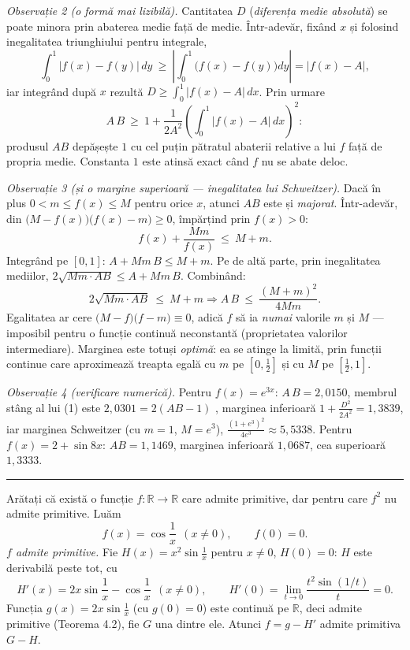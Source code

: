 \emph{Observație 2 (o formă mai lizibilă).} Cantitatea $D$ (\emph{diferența medie absolută}) se poate minora prin abaterea medie față de medie. Într-adevăr, fixând $x$ și folosind inegalitatea triunghiului pentru integrale,
\[ \int_{0}^{1}\bigl|f(x)-f(y)\bigr|\,dy\ \ge\ \left|\int_{0}^{1}\bigl(f(x)-f(y)\bigr)dy\right|=\bigl|f(x)-A\bigr| , \]
iar integrând după $x$ rezultă $D\ge\displaystyle\int_{0}^{1}\bigl|f(x)-A\bigr|\,dx$. Prin urmare
\[ A\,B\ \ge\ 1+\frac{1}{2A^{2}}\left(\int_{0}^{1}\bigl|f(x)-A\bigr|\,dx\right)^{2} : \]
produsul $AB$ depășește $1$ cu cel puțin pătratul abaterii relative a lui $f$ față de propria medie. Constanta $1$ este atinsă exact când $f$ nu se abate deloc.

\emph{Observație 3 (și o margine superioară --- inegalitatea lui Schweitzer).} Dacă în plus $0<m\le f(x)\le M$ pentru orice $x$, atunci $AB$ este și \emph{majorat}. Într-adevăr, din $\bigl(M-f(x)\bigr)\bigl(f(x)-m\bigr)\ge0$, împărțind prin $f(x)>0$:
\[ f(x)+\frac{Mm}{f(x)}\ \le\ M+m . \]
Integrând pe $[0,1]$: $A+Mm\,B\le M+m$. Pe de altă parte, prin inegalitatea mediilor, $2\sqrt{Mm\cdot AB}\le A+Mm\,B$. Combinând:
\[ 2\sqrt{Mm\cdot AB}\ \le\ M+m \Longrightarrow A\,B\ \le\ \frac{(M+m)^{2}}{4Mm} . \]
Egalitatea ar cere $\bigl(M-f\bigr)\bigl(f-m\bigr)\equiv0$, adică $f$ să ia \emph{numai} valorile $m$ și $M$ --- imposibil pentru o funcție continuă neconstantă (proprietatea valorilor intermediare). Marginea este totuși \emph{optimă}: ea se atinge la limită, prin funcții continue care aproximează treapta egală cu $m$ pe $\left[0,\frac12\right]$ și cu $M$ pe $\left[\frac12,1\right]$.

\emph{Observație 4 (verificare numerică).} Pentru $f(x)=e^{3x}$: $A\,B=2{,}0150$, membrul stâng al lui (1) este $2{,}0301=2(AB-1)$ \checkmark, marginea inferioară $1+\frac{D^{2}}{2A^{2}}=1{,}3839$, iar marginea Schweitzer (cu $m=1$, $M=e^{3}$), $\frac{(1+e^{3})^{2}}{4e^{3}}\approx5{,}5338$. Pentru $f(x)=2+\sin 8x$: $AB=1{,}1469$, marginea inferioară $1{,}0687$, cea superioară $1{,}3333$.
\vspace{1mm}\hrule

Arătați că există o funcție $f:\mathbb{R}\to\mathbb{R}$ care admite primitive, dar pentru care $f^2$ nu admite primitive.
\sol Luăm
\[ f(x)=\cos\frac1x\ \ (x\neq0),\qquad f(0)=0 . \]
\emph{$f$ admite primitive.} Fie $H(x)=x^2\sin\frac1x$ pentru $x\neq0$, $H(0)=0$: $H$ este derivabilă peste tot, cu
\[ H'(x)=2x\sin\frac1x-\cos\frac1x\ \ (x\neq0),\qquad H'(0)=\lim_{t\to0}\frac{t^2\sin(1/t)}{t}=0 . \]
Funcția $g(x)=2x\sin\frac1x$ (cu $g(0)=0$) este continuă pe $\mathbb{R}$, deci admite primitive (Teorema 4.2), fie $G$ una dintre ele. Atunci $f=g-H'$ admite primitiva $G-H$.

